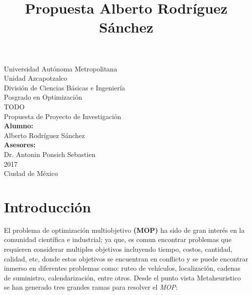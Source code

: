 \documentclass[letterpaper,10pt]{article}
\title{Propuesta Alberto Rodríguez Sánchez}
\begin{document}
\renewcommand{\refname}{Bibliografía}%
\thispagestyle{empty}

\begin{center}
	{\Huge Universidad Autónoma Metropolitana }\\
	{\huge Unidad Azcapotzalco}\\
	\vspace{0.5cm}
	{\Large División de Ciencias Básicas e Ingeniería}\\
	\vspace{1.0cm}
	{\large Posgrado en Optimización}\\
	\vspace{2.0cm}	
	{\Large TODO}\\
	\vspace{1.0cm}
	{\large Propuesta de Proyecto de Investigación}\\
	\vspace{2.0cm}
	{\large\textbf{Alumno:}}\\
	Alberto Rodríguez Sánchez\\
	\vspace{1.5cm}
	\bigskip
	{\large\textbf{Asesores:}}\\ 
	Dr. Antonin Ponsich Sebastien\\
	\vspace{1.5cm}
	 2017\\
	\vspace{1.0cm}
	Ciudad de México\\ 
\end{center}
\newpage
\tableofcontents
\newpage
\section{Introducción}

El problema de optimización multiobjetivo \textbf{(MOP)} ha sido de gran interés en la comunidad científica e industrial; ya que, es comun encontrar problemas que requieren considerar multiples objetivos incluyendo tiempo, costos, cantidad, calidad, etc, donde estos objetivos se encuentran en conflicto y se puede encontrar inmerso en diferentes problemas como: ruteo de vehículos, localización, cadenas de suministro, calendarización, entre otros. Desde el punto vista Metaheuristico se han generado tres grandes ramas para resolver el \emph{MOP}:
\end{document}

